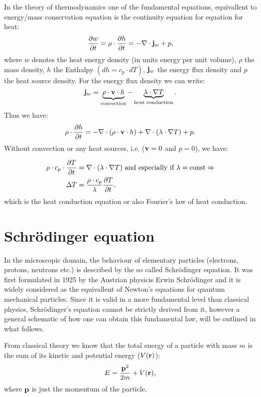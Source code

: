 \documentclass[11pt,a4paper]{report}
\def\Nabla{\ensuremath\bm{\nabla}}
\def\bm{\ensuremath\mathbf}
\def\div{\ensuremath\Nabla\cdot}
\def\lap{\ensuremath\Delta}
\begin{document}
In the theory of thermodynamics one of the fundamental equations, equivallent to energy/mass conservation equation is the continuity equation for equation for heat:
\begin{equation*}
  \frac{\partial w}{\partial t} = \rho \cdot \frac{\partial h}{\partial t} = -\div \bm{j}_w +p, 
\end{equation*}
where $w$ denotes the heat energy density (in units energy per unit volume), $\rho$ the mass density, $h$ the Enthalpy $(dh = c_p\cdot dT)$, $\bm{j}_w$ the energy flux density and $p$ the heat source density. For the energy flux density we can write: 
\begin{equation*}
  \bm{j}_w = \underbrace{\rho \cdot \bm{v} \cdot h}_{\text{convection}} - \underbrace{\lambda \cdot \Nabla T}_{\text{heat conduction}}.
\end{equation*}
Thus we have:
\begin{equation*}
   \rho \cdot \frac{\partial h}{\partial t} = -\div (\rho \cdot \bm{v} \cdot h) + \div (\lambda \cdot \Nabla T)  +p.  
\end{equation*}
Without convection or any heat sources, i.e. ($\bm{v} = 0 $ and $p = 0$), we have:

\begin{align}
  \rho \cdot c_p \cdot \frac{\partial T}{\partial t} &= \div (\lambda \cdot \Nabla T)  \text{ and especially if } \lambda = \text{const} \Rightarrow \\
  \lap T &= \frac{\rho \cdot c_p}{\lambda}\frac{\partial T}{\partial t}, 
\end{align}
which is the heat conduction equation or also Fourier's law of heat conduction. 


\section {Schr\"odinger equation}

In the microscopic domain, the behaviour of elementary particles (electrons, protons, neutrons etc.) is described by the so called Schr\"odinger equation. It was first formulated in 1925 by the Austrian physicis Erwin Schr\"odinger and it is widely considered as the equivallent of Newton's equations for quantum mechanical particles. Since it is valid in a more fundamental level than classical physics, Schr\"odinger's equation cannot be strictly derived from it, however a general schematic of how one can obtain this fundamental law, will be outlined in what follows. 

From classical theory we know that the total energy of a particle with mass $m$ is the sum of its kinetic and potential energy ($V(\bm{r})$): 
\begin{equation} \label{eq:hamiltonequation}
  E = \frac{\bm{p}^2}{2m}+V(\bm{r}), 
\end{equation}
where $\bm{p}$ is  just the momentum of the particle. 
\end{document}

